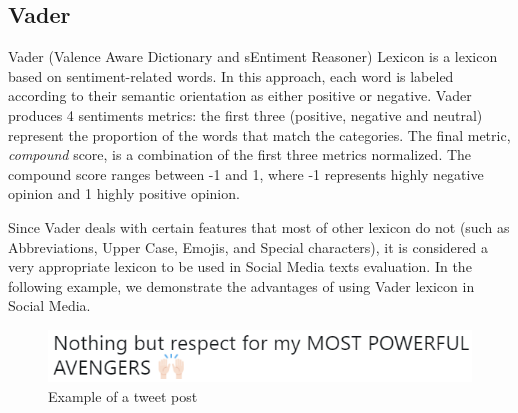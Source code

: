 \subsection{Vader\label{vader}}
Vader (Valence Aware Dictionary and sEntiment Reasoner) 
Lexicon is a lexicon based on sentiment-related words. In this approach, each word is labeled according to their semantic orientation as either positive or negative. Vader produces 4 sentiments metrics: the first three (positive, negative and neutral) represent the proportion of the words that match the categories. The final metric, \textit{compound} score, is a combination of the first three metrics normalized.
The compound score ranges between -1 and 1, where -1 represents highly negative opinion and 1 highly positive opinion.


Since Vader deals with certain features that most of  other lexicon do not (such as Abbreviations, Upper Case, Emojis, and Special characters), it is considered a very appropriate lexicon to be used in Social Media texts evaluation. 
In the following example, we demonstrate the advantages of using Vader lexicon in Social Media.


\begin{figure}[htb]
    \begin{center}
        \includegraphics[width=0.8\linewidth]{img/Twitter1.png}
    \end{center}
       \caption{Example of a tweet post} %
    \label{fig:tweet1}
\end{figure}

